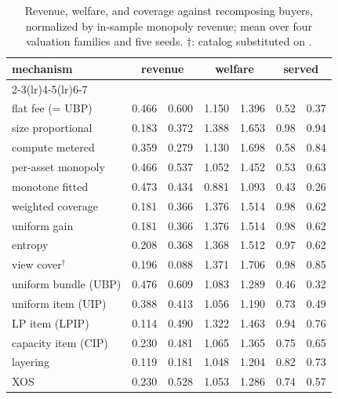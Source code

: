 \begin{table}[t]
  \centering
  \caption{Revenue, welfare, and coverage against recomposing buyers, normalized by in-sample monopoly revenue; mean over four valuation families and five seeds. $\dagger$: catalog substituted on \sqlshare{}.}
  \label{tab:cross}
  \begin{tabular}{lcccccc}
    \toprule
    mechanism & \multicolumn{2}{c}{revenue} & \multicolumn{2}{c}{welfare} & \multicolumn{2}{c}{served} \\
    \cmidrule(lr){2-3}\cmidrule(lr){4-5}\cmidrule(lr){6-7}
    & \tpch{} & \sqlshare{} & \tpch{} & \sqlshare{} & \tpch{} & \sqlshare{} \\
    \midrule
    flat fee (= UBP) & 0.466 & 0.600 & 1.150 & 1.396 & 0.52 & 0.37 \\
    size proportional & 0.183 & 0.372 & 1.388 & 1.653 & 0.98 & 0.94 \\
    compute metered & 0.359 & 0.279 & 1.130 & 1.698 & 0.58 & 0.84 \\
    per-asset monopoly & 0.466 & 0.537 & 1.052 & 1.452 & 0.53 & 0.63 \\
    monotone fitted & 0.473 & 0.434 & 0.881 & 1.093 & 0.43 & 0.26 \\
    \qirana{} weighted coverage & 0.181 & 0.366 & 1.376 & 1.514 & 0.98 & 0.62 \\
    \qirana{} uniform gain & 0.181 & 0.366 & 1.376 & 1.514 & 0.98 & 0.62 \\
    \qirana{} entropy & 0.208 & 0.368 & 1.368 & 1.512 & 0.97 & 0.62 \\
    \querymarket{} view cover$^{\dagger}$ & 0.196 & 0.088 & 1.371 & 1.706 & 0.98 & 0.85 \\
    uniform bundle (UBP) & 0.476 & 0.609 & 1.083 & 1.289 & 0.46 & 0.32 \\
    uniform item (UIP) & 0.388 & 0.413 & 1.056 & 1.190 & 0.73 & 0.49 \\
    LP item (LPIP) & 0.114 & 0.490 & 1.322 & 1.463 & 0.94 & 0.76 \\
    capacity item (CIP) & 0.230 & 0.481 & 1.065 & 1.365 & 0.75 & 0.65 \\
    layering & 0.119 & 0.181 & 1.048 & 1.204 & 0.82 & 0.73 \\
    XOS & 0.230 & 0.528 & 1.053 & 1.286 & 0.74 & 0.57 \\
    \bottomrule
  \end{tabular}
\end{table}
